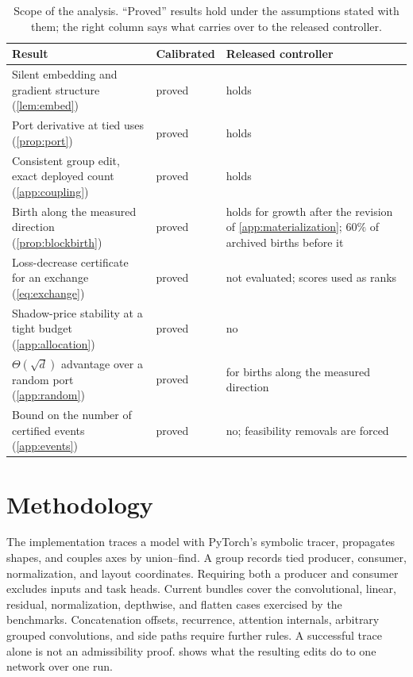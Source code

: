 \documentclass[10pt]{article}
\theoremstyle{paper}
\begin{document}
\begin{table}[t]
\centering
\caption{Scope of the analysis. ``Proved'' results hold under the assumptions stated with them; the right column says what carries over to the released controller.}
\label{tab:theory-scope}
\footnotesize
\setlength{\tabcolsep}{3.0pt}
\begin{tabular}{@{}p{}p{}p{}@{}}
\toprule
Result & Calibrated & Released controller \\
\midrule
Silent embedding and gradient structure (\cref{lem:embed}) & proved & holds \\
Port derivative at tied uses (\cref{prop:port}) & proved & holds \\
Consistent group edit, exact deployed count (\cref{app:coupling}) & proved & holds \\
Birth along the measured direction (\cref{prop:blockbirth}) & proved & holds for growth after the revision of \cref{app:materialization}; $60\%$ of archived births before it \\
Loss-decrease certificate for an exchange (\cref{eq:exchange}) & proved & not evaluated; scores used as ranks \\
Shadow-price stability at a tight budget (\cref{app:allocation}) & proved & no \\
$\Theta(\sqrt d)$ advantage over a random port (\cref{app:random}) & proved & for births along the measured direction \\
Bound on the number of certified events (\cref{app:events}) & proved & no; feasibility removals are forced \\
\bottomrule
\end{tabular}
\end{table}

\section{Methodology}
\label{sec:method}

The implementation traces a model with PyTorch's symbolic tracer, propagates shapes, and couples axes by union--find. A group records tied producer, consumer, normalization, and layout coordinates. Requiring both a producer and consumer excludes inputs and task heads. Current bundles cover the convolutional, linear, residual, normalization, depthwise, and flatten cases exercised by the benchmarks. Concatenation offsets, recurrence, attention internals, arbitrary grouped convolutions, and side paths require further rules. A successful trace alone is not an admissibility proof.  shows what the resulting edits do to one network over one run.
\end{document}
